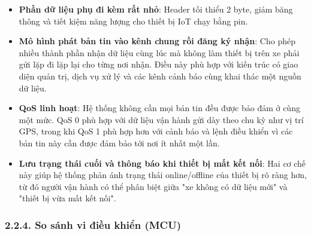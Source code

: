 \documentclass[a4paper]{extarticle}
\providecommand{\tightlist}{%
  \setlength{\itemsep}{0pt}\setlength{\parskip}{0pt}}
\begin{document}
\begin{itemize}
\tightlist
\item
  \textbf{Phần dữ liệu phụ đi kèm rất nhỏ}: Header tối thiểu 2 byte, giảm băng thông và
  tiết kiệm năng lượng cho thiết bị IoT chạy bằng pin.
\item
  \textbf{Mô hình phát bản tin vào kênh chung rồi đăng ký nhận}: Cho phép nhiều thành phần nhận dữ
  liệu cùng lúc mà không làm thiết bị trên xe phải gửi lặp đi lặp lại
  cho từng nơi nhận. Điều này phù hợp với kiến trúc có giao diện quản trị, dịch
  vụ xử lý và các kênh cảnh báo cùng khai thác một nguồn dữ liệu.
\item
  \textbf{QoS linh hoạt}: Hệ thống không cần mọi bản tin đều được bảo
  đảm ở cùng một mức. QoS 0 phù hợp với dữ liệu vận hành gửi dày theo
  chu kỳ
  như vị trí GPS, trong khi QoS 1 phù hợp hơn với cảnh báo và lệnh điều
  khiển vì các bản tin này cần được đảm bảo tới nơi ít nhất một lần.
\item
  \textbf{Lưu trạng thái cuối và thông báo khi thiết bị mất kết nối}: Hai cơ chế này giúp hệ thống
  phản ánh trạng thái online/offline của thiết bị rõ ràng hơn, từ đó
  người vận hành có thể phân biệt giữa "xe không có dữ liệu mới" và
  "thiết bị vừa mất kết nối".
\end{itemize}

\subsubsection{2.2.4. So sánh vi điều khiển
(MCU)}\label{224-so-suxe1nh-vi-ux111iux1ec1u-khiux1ec3n-mcu}
\end{document}
